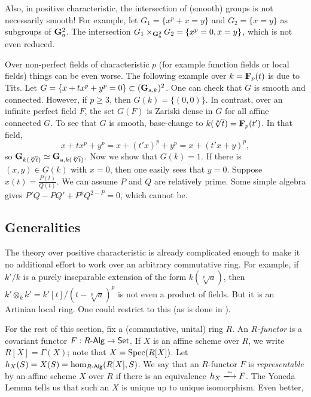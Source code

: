 Also, in positive characteristic, the intersection of (smooth) groups is not 
necessarily smooth! For example, let $G_1=\{x^p+x=y\}$ and 
$G_2=\{x=y\}$ as subgroups of $\mathbf{G}_{\mathrm{a}}^2$. The intersection 
$G_1\times_{\mathbf{G}_{\mathrm{a}}^2} G_2 = \{x^p=0, x=y\}$, which is not even reduced. 

Over non-perfect fields of characteristic $p$ (for example function fields or 
local fields) things can be even worse. The following example over 
$k=\mathbf{F}_p(t)$ is due to Tits. Let 
$G=\{x+t x^p+y^p=0\}\subset (\mathbf{G}_{\mathrm{a},k})^2$. One can check that $G$ is 
smooth and connected. However, if $p\geqslant 3$, then 
$G(k)=\{(0,0)\}$. In contrast, over an infinite perfect field $F$, the set 
$G(F)$ is Zariski dense in $G$ for all affine connected $G$. To see that 
$G$ is smooth, base-change to $k(\sqrt[p] t)=\mathbf{F}_p(t')$. In that field, 
\[
  x+t x^p+y^p = x+(t'x)^p + y^p = x+(t'x+y)^p ,
\]
so $\mathbf{G}_{k(\sqrt[p] t)}\simeq \mathbf{G}_{\mathrm{a},k(\sqrt[p] t)}$. Now we show 
that $G(k)=1$. If there is $(x,y)\in G(k)$ with $x=0$, then one easily sees 
that $y=0$. Suppose $x(t)=\frac{P(t)}{Q(t)}$. We can assume $P$ and $Q$ are 
relatively prime. Some simple algebra gives $P' Q-P Q' + P^p Q^{2-P} = 0$, 
which cannot be. 





\subsection{Generalities}

The theory over positive characteristic is already complicated enough to make 
it no additional effort to work over an arbitrary commutative ring. For 
example, if $k'/k$ is a purely inseparable extension of the form 
$k(\sqrt[p] a)$, then $k'\otimes_k k' = k'[t]/(t-\sqrt[p] a)^p$ is not even 
a product of fields. But it is an Artinian local ring. One could restrict to 
this (as is done in \cite[VIa]{sga3}). 

For the rest of this section, fix a (commutative, unital) ring $R$. An 
\emph{$R$-functor} is a covariant functor 
$F:R\text{-}\mathsf{Alg}\to \mathsf{Set}$. If $X$ is an affine scheme over $R$, we write 
$R[X]=\Gamma(X)$; note that $X=\operatorname{Spec}(R[X])$. Let 
$h_X(S)=X(S)=\hom_{R\text{-}\mathsf{Alg}}(R[X],S)$. We say that an $R$-functor $F$ is 
\emph{representable} by an affine scheme $X$ over $R$ if there is an 
equivalence $h_X \isomorphism F$. The Yoneda Lemma tells us that such an $X$ is 
unique up to unique isomorphism. Even better, 

